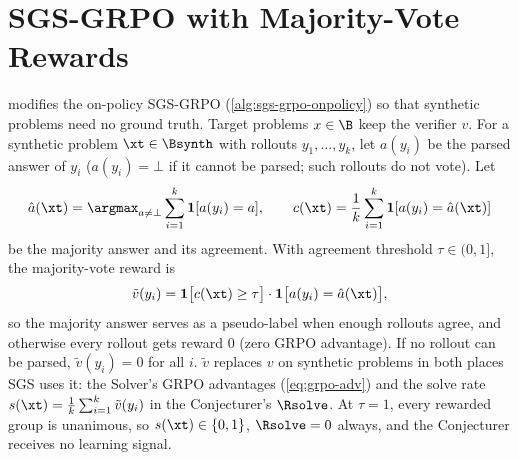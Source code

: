 \section{SGS-GRPO with Majority-Vote Rewards}
\label{app:sgs-grpo-mv}

 modifies the on-policy SGS-GRPO
(\cref{alg:sgs-grpo-onpolicy}) so that synthetic problems need no ground truth.
Target problems $x \in \B$ keep the verifier $v$. For a synthetic problem
$\xt \in \Bsynth$ with rollouts $y_1,\dots,y_k$, let $a(y_i)$ be the parsed
answer of $y_i$ ($a(y_i) = \bot$ if it cannot be parsed; such rollouts do not
vote). Let
\begin{equation}
  \hat{a}(\xt) = \argmax_{a \neq \bot} \sum_{i=1}^{k} \mathbf{1}[a(y_i) = a],
  \qquad
  c(\xt) = \frac{1}{k} \sum_{i=1}^{k} \mathbf{1}[a(y_i) = \hat{a}(\xt)]
  \label{eq:mv-mode}
\end{equation}
be the majority answer and its agreement. With agreement threshold
$\tau \in (0, 1]$, the majority-vote reward is
\begin{equation}
  \tilde{v}(y_i) = \mathbf{1}\big[c(\xt) \geq \tau\big] \cdot \mathbf{1}\big[a(y_i) = \hat{a}(\xt)\big],
  \label{eq:mv-reward}
\end{equation}
so the majority answer serves as a pseudo-label when enough rollouts agree,
and otherwise every rollout gets reward $0$ (zero GRPO advantage). If no
rollout can be parsed, $\tilde{v}(y_i) = 0$ for all $i$.
$\tilde{v}$ replaces $v$ on synthetic problems in both places SGS uses it:
the Solver's GRPO advantages (\cref{eq:grpo-adv}) and the solve rate
$s(\xt) = \frac{1}{k}\sum_{i=1}^{k} \tilde{v}(y_i)$ in the Conjecturer's
$\Rsolve$. At $\tau = 1$, every rewarded group is unanimous, so
$s(\xt) \in \{0, 1\}$, $\Rsolve = 0$ always, and the Conjecturer receives no
learning signal.

